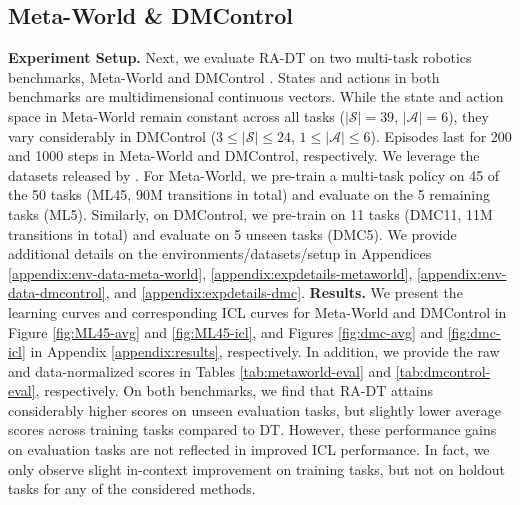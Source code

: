 \documentclass{article}
\begin{document}
\subsection{Meta-World \& DMControl}\label{sec:exp-robotics}
\textbf{Experiment Setup.}
Next, we evaluate RA-DT on two multi-task robotics benchmarks, Meta-World \citep{Yu:22} and DMControl \citep{Tassa:18}.
States and actions in both benchmarks are multidimensional continuous vectors.
While the state and action space in Meta-World remain constant across all tasks ($|\mathcal{S}|=39$, $|\mathcal{A}|=6$), they vary considerably in DMControl ($3\leq|\mathcal{S}|\leq 24$, $1\leq|\mathcal{A}|\leq6$).
Episodes last for 200 and 1000 steps in Meta-World and DMControl, respectively.
We leverage the datasets released by \citet{Schmied:23}.
For Meta-World, we pre-train a multi-task policy on 45 of the 50 tasks (ML45, 90M transitions in total) and evaluate on the 5 remaining tasks (ML5).
Similarly, on DMControl, we pre-train on 11 tasks (DMC11, 11M transitions in total) and evaluate on 5 unseen tasks (DMC5).
We provide additional details on the environments/datasets/setup in Appendices \ref{appendix:env-data-meta-world}, \ref{appendix:expdetails-metaworld}, \ref{appendix:env-data-dmcontrol}, and \ref{appendix:expdetails-dmc}.
\textbf{Results.}
We present the learning curves and corresponding ICL curves for Meta-World and DMControl in Figure \ref{fig:ML45-avg} and \ref{fig:ML45-icl}, and Figures \ref{fig:dmc-avg} and \ref{fig:dmc-icl} in Appendix \ref{appendix:results}, respectively.
In addition, we provide the raw and data-normalized scores in Tables \ref{tab:metaworld-eval} and \ref{tab:dmcontrol-eval}, respectively.
On both benchmarks, we find that RA-DT attains
considerably higher scores on unseen evaluation tasks, but slightly lower average scores across training tasks compared to DT.
However, these performance gains on evaluation tasks are not reflected in improved ICL performance.
In fact, we only observe slight in-context improvement on training tasks, but not on holdout tasks for any of the considered methods.
\end{document}
